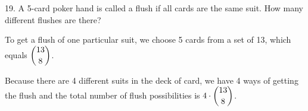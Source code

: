 \documentclass{hippoidC}
\begin{document}
\begin{prooflist}{19. A 5-card poker hand is called a flush if all cards are the same suit. How many different flushes are there?}
\item To get a flush of one particular suit, we choose 5 cards from a set of 13,
    which equals $\dbinom{13}{8}$.
\item Because there are 4 different suits in the deck of card, we have 4 ways of
    getting the flush and the total number of flush possibilities is $4 \cdot
    \dbinom{13}{8}$.
\end{prooflist}
\end{document}
